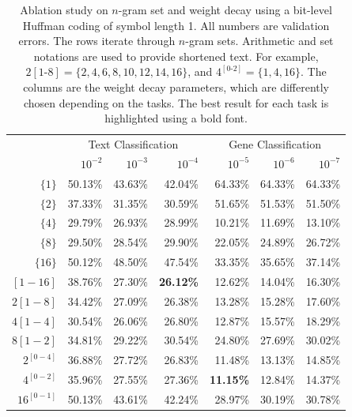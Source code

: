 \documentclass[sigconf,review, anonymous]{acmart}
\begin{document}
\begin{table}[t]
  \caption{Ablation study on \(n\)-gram set and weight decay using a bit-level Huffman coding of symbol length 1. All numbers are validation errors. The rows iterate through \(n\)-gram sets. Arithmetic and set notations are used to provide shortened text. For example, \(2[1\text{-}8] = \{2,4,6,8,10,12,14,16\}\), and \(4^{[0\text{-}2]}=\{1,4,16\}\). The columns are the weight decay parameters, which are differently chosen depending on the tasks. The best result for each task is highlighted using a bold font.}
  \label{tab:huffman-gram}
  \begin{center}
    \begin{tabular}{r|rrr|rrr}
      \hline
      & \multicolumn{3}{|c}{Text Classification}  & \multicolumn{3}{|c}{Gene Classification} \\
      & \(10^{-2}\) & \(10^{-3}\) & \(10^{-4}\) & \(10^{-5}\) & \(10^{-6}\) & \(10^{-7}\) \\ \hline
      \(\{1\}\) & 50.13\% & 43.63\% & 42.04\% & 64.33\% & 64.33\% & 64.33\% \\
      \(\{2\}\) & 37.33\% & 31.35\% & 30.59\% & 51.65\% & 51.53\% & 51.50\% \\
      \(\{4\}\) & 29.79\% & 26.93\% & 28.99\% & 10.21\% & 11.69\% & 13.10\% \\
      \(\{8\}\) & 29.50\% & 28.54\% & 29.90\% & 22.05\% & 24.89\% & 26.72\% \\
      \(\{16\}\) & 50.12\% & 48.50\% & 47.54\% & 33.35\% & 35.65\% & 37.14\% \\
      \([1-16]\) & 38.76\% & 27.30\% & \textbf{26.12\%} & 12.62\% & 14.04\% & 16.30\% \\
      \(2[1-8]\) & 34.42\% & 27.09\% & 26.38\% & 13.28\% & 15.28\% & 17.60\% \\
      \(4[1-4]\) & 30.54\% & 26.06\% & 26.80\% & 12.87\% & 15.57\% & 18.29\% \\
      \(8[1-2]\) & 34.81\% & 29.22\% & 30.54\% & 24.80\% & 27.69\% & 30.02\% \\
      \(2^{[0-4]}\) & 36.88\% & 27.72\% & 26.83\% & 11.48\% & 13.13\% & 14.85\% \\
      \(4^{[0-2]}\) & 35.96\% & 27.55\% & 27.36\% & \textbf{11.15\%} & 12.84\% & 14.37\% \\
      \(16^{[0-1]}\) & 50.13\% & 43.61\% & 42.24\% & 28.97\% & 30.19\% & 30.78\% \\
    \hline
    \end{tabular}
  \end{center}
\end{table}
\end{document}
